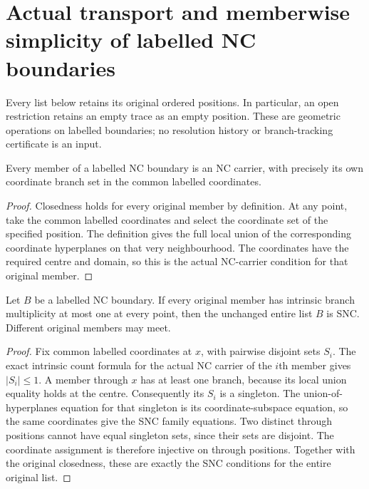 \section{Actual transport and memberwise simplicity of labelled NC boundaries}
\label{sec:nc-labelled-boundary-transport}

Every list below retains its original ordered positions. In particular,
an open restriction retains an empty trace as an empty position. These
are geometric operations on labelled boundaries; no resolution history
or branch-tracking certificate is an input.

\begin{lemma}
\label{hir:labelled-nc-each-original-carrier}
\leanok
Every member of a labelled NC boundary is an NC carrier, with precisely
its own coordinate branch set in the common labelled coordinates.
\end{lemma}
\begin{proof}
Closedness holds for every original member by definition. At any point,
take the common labelled coordinates and select the coordinate set of
the specified position. The definition gives the full local union of
the corresponding coordinate hyperplanes on that very neighbourhood.
The coordinates have the required centre and domain, so this is the
actual NC-carrier condition for that original member.
\end{proof}

\begin{theorem}
\label{hir:labelled-nc-memberwise-count-one-snc}
\leanok
Let $B$ be a labelled NC boundary. If every original member has intrinsic
branch multiplicity at most one at every point, then the unchanged
entire list $B$ is SNC. Different original members may meet.
\end{theorem}
\begin{proof}
Fix common labelled coordinates at $x$, with pairwise disjoint sets
$S_i$. The exact intrinsic count formula for the actual NC carrier of
the $i$th member gives $|S_i|\le1$. A member through $x$ has at least
one branch, because its local union equality holds at the centre.
Consequently its $S_i$ is a singleton. The union-of-hyperplanes
equation for that singleton is its coordinate-subspace equation, so
the same coordinates give the SNC family equations. Two distinct
through positions cannot have equal singleton sets, since their sets
are disjoint. The coordinate assignment is therefore injective on
through positions. Together with the original closedness, these are
exactly the SNC conditions for the entire original list.
\end{proof}

